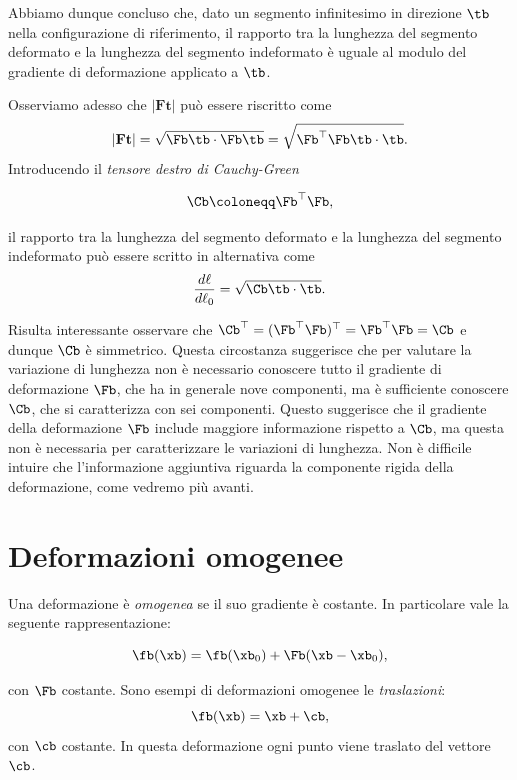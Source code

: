 Abbiamo dunque concluso che, dato  un segmento infinitesimo in direzione $\tb$ nella configurazione di riferimento, il rapporto tra la lunghezza del segmento deformato e la lunghezza del segmento indeformato è uguale al modulo del gradiente di deformazione applicato a $\tb$.

Osserviamo adesso che $|\mathbf{Ft}|$ può essere riscritto come
\begin{equation}
	|\mathbf{Ft}|=\sqrt{\Fb\tb\cdot\Fb\tb}=\sqrt{\Fb^\top\Fb\tb\cdot\tb}.
\end{equation}
Introducendo il \textit{tensore destro di Cauchy-Green}
\begin{definition}
	\begin{equation}
\Cb\coloneqq\Fb^\top\Fb,
\end{equation}
\end{definition}
il rapporto tra la lunghezza del segmento deformato e la lunghezza del segmento indeformato può essere scritto in alternativa come
\begin{equation}
	\frac{d\ell}{d\ell_0}=\sqrt{\Cb\tb\cdot\tb}.
\end{equation}

\begin{remark}
Risulta interessante osservare che $\Cb^\top=(\Fb^\top\Fb)^\top=\Fb^\top\Fb=\Cb$ e dunque $\Cb$ è simmetrico.  Questa circostanza suggerisce che per valutare la variazione di lunghezza non è necessario conoscere tutto il gradiente di deformazione $\Fb$, che ha in generale nove componenti, ma è sufficiente conoscere $\Cb$, che si caratterizza con sei componenti. Questo suggerisce che il gradiente della deformazione $\Fb$ include maggiore informazione rispetto a $\Cb$, ma questa non è necessaria per caratterizzare le variazioni di lunghezza. Non è difficile intuire che l'informazione aggiuntiva riguarda la componente rigida della deformazione, come vedremo più avanti.
\end{remark}


\section{Deformazioni omogenee}
Una deformazione è \textit{omogenea} se il suo gradiente è costante. In particolare vale la seguente rappresentazione:
\begin{definition}
	\begin{equation}
	\fb(\xb)=\fb(\xb_0)+\Fb(\xb-\xb_0),
\end{equation}
\end{definition}
con $\Fb$ costante. Sono esempi di deformazioni omogenee le \textit{traslazioni}:
\begin{equation}
	\fb(\xb)=\xb +\cb,
\end{equation}
con $\cb$ costante. In questa deformazione ogni punto viene traslato del vettore $\cb$.

